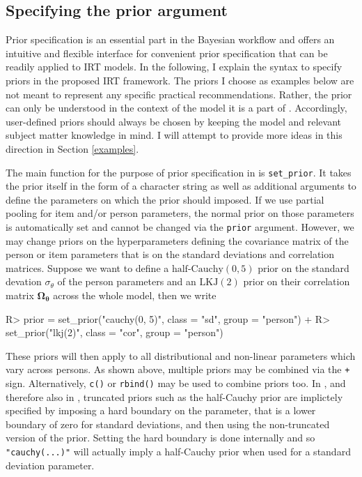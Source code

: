 \documentclass[jss]{jss}
\begin{document}
\hypertarget{brms-prior}{%
\subsection{Specifying the prior argument}\label{brms-prior}}

Prior specification is an essential part in the Bayesian workflow and
 offers an intuitive and flexible interface for convenient
prior specification that can be readily applied to IRT models. In the
following, I explain the syntax to specify priors in the proposed IRT
framework. The priors I choose as examples below are not meant to
represent any specific practical recommendations. Rather, the prior can
only be understood in the context of the model it is a part of
\citep{gelman2017}. Accordingly, user-defined priors should always be
chosen by keeping the model and relevant subject matter knowledge in
mind. I will attempt to provide more ideas in this direction in Section
\ref{examples}.

The main function for the purpose of prior specification in 
is \texttt{set\_prior}. It takes the prior itself in the form of a
character string as well as additional arguments to define the
parameters on which the prior should imposed. If we use partial pooling
for item and/or person parameters, the normal prior on those parameters
is automatically set and cannot be changed via the \texttt{prior}
argument. However, we may change priors on the hyperparameters defining
the covariance matrix of the person or item parameters that is on the
standard deviations and correlation matrices. Suppose we want to define
a \(\text{half-Cauchy}(0, 5)\) prior on the standard devation
\(\sigma_\theta\) of the person parameters and an \(\text{LKJ}(2)\)
prior on their correlation matrix \(\mathbf{\Omega_\theta}\) across the
whole model, then we write

\begin{CodeChunk}

\begin{CodeInput}
R> prior = set_prior("cauchy(0, 5)", class = "sd", group = "person") +
R>   set_prior("lkj(2)", class = "cor", group = "person")
\end{CodeInput}
\end{CodeChunk}

These priors will then apply to all distributional and non-linear
parameters which vary across persons. As shown above, multiple priors
may be combined via the \texttt{+} sign. Alternatively, \texttt{c()} or
\texttt{rbind()} may be used to combine priors too. In ,
and therefore also in , truncated priors such as the
half-Cauchy prior are implictely specified by imposing a hard boundary
on the parameter, that is a lower boundary of zero for standard
deviations, and then using the non-truncated version of the prior.
Setting the hard boundary is done internally and so
\texttt{"cauchy(...)"} will actually imply a half-Cauchy prior when used
for a standard deviation parameter.
\end{document}
